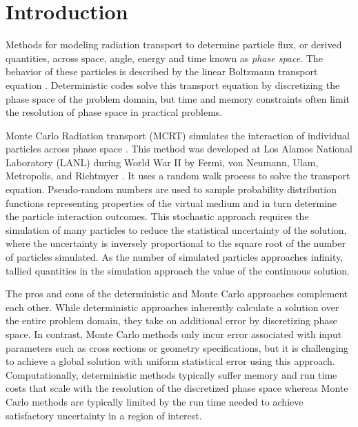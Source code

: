\newcommand{\dagmcModel}[2] {
  \null %
  \textbf{\uppercase{#1}} 
  \begin{adjustwidth}{2.5em}{0pt}
    #2
  \end{adjustwidth}
  \null
}

\chapter{Introduction}\label{ch:introduction}

Methods for modeling radiation transport to determine particle flux, or derived
quantities, across space, angle, energy and time known as \textit{phase
  space}. The behavior of these particles is described by the linear Boltzmann
transport equation \cite{Ulam_1949}. Deterministic codes solve this transport
equation by discretizing the phase space of the problem domain, but time and memory
constraints often limit the resolution of phase space in practical problems.

Monte Carlo Radiation transport (MCRT) simulates the
interaction of individual particles across phase space \cite{Lewis_1993}. This
method was developed at Los Alamos National Laboratory (LANL) during World War
II by Fermi, von Neumann, Ulam, Metropolis, and Richtmyer \cite{LANL_1987}. It
uses a random walk process to solve the transport equation. Pseudo-random
numbers are used to sample probability distribution functions representing
properties of the virtual medium and in turn determine the particle interaction
outcomes. This stochastic approach requires the simulation of many particles to
reduce the statistical uncertainty of the solution, where the uncertainty is
inversely proportional to the square root of the number of particles
simulated. As the number of simulated particles approaches infinity, tallied
quantities in the simulation approach the value of the continuous solution.

The pros and cons of the deterministic and Monte Carlo approaches complement
each other. While deterministic approaches inherently calculate a solution over
the entire problem domain, they take on additional error by discretizing phase
space. In contrast, Monte Carlo methods only incur error associated with input
parameters such as cross sections or geometry specifications, but it is
challenging to achieve a global solution with uniform statistical error using
this approach. Computationally, deterministic methods typically suffer memory
and run time costs that scale with the resolution of the discretized phase space
whereas Monte Carlo methods are typically limited by the run time needed to
achieve satisfactory uncertainty in a region of interest.


